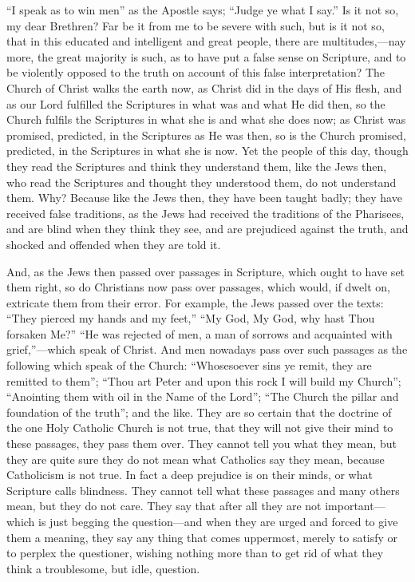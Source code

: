 ``I speak as to win men'' as the Apostle says; ``Judge
ye what I say.'' Is it not so, my dear Brethren? Far be it from me
to be severe with such, but is it not so, that in this educated and
intelligent and great people, there are multitudes,—nay more, the
great majority is such, as to have put a false sense on Scripture, and
to be violently opposed to the truth on account of this false
interpretation? The Church of Christ walks the earth now, as Christ
did in the days of His flesh, and as our Lord fulfilled the Scriptures
in what was and what He did then, so the Church fulfils the Scriptures
in what she is and what she does now; as Christ was promised,
predicted, in the Scriptures as He was then, so is the Church
promised, predicted, in the Scriptures in what she is now. Yet the
people of this day, though they read the Scriptures and think they
understand them, like the Jews then, who read the Scriptures and
thought they understood them, do not understand them. Why? Because
like the Jews then, they have been taught badly; they have received
false traditions, as the Jews had received the traditions of the
Pharisees, and are blind when they think they see, and are prejudiced
against the truth, and shocked and offended when they are told it.

And, as the Jews then passed over passages in
Scripture, which ought to have set them right, so do Christians now
pass over passages, which would, if dwelt on, extricate them from
their error. For example, the Jews passed over the texts: ``They
pierced my hands and my feet,'' ``My God, My God, why hast Thou
forsaken Me?'' ``He was rejected of men, a man of sorrows and acquainted
with grief,''—which speak of Christ. And men nowadays pass over such
passages as the following which speak of the Church: ``Whosesoever sins
ye remit, they are remitted to them''; ``Thou art Peter and upon
this rock I will build my Church''; ``Anointing them with oil in the
Name of the Lord''; ``The Church the pillar and foundation of the truth'';
and the like. They are so certain that the doctrine of the one Holy
Catholic Church is not true, that they will not give their mind to
these passages, they pass them over. They cannot tell you what they
mean, but they are quite sure they do not mean what Catholics say they
mean, because Catholicism is not true. In fact a deep prejudice is on
their minds, or what Scripture calls blindness. They cannot tell what
these passages and many others mean, but they do not care. They say
that after all they are not important—which is just begging the
question—and when they are urged and forced to give them a meaning,
they say any thing that comes uppermost, merely to satisfy or to
perplex the questioner, wishing nothing more than to get rid of what
they think a troublesome, but idle, question.

